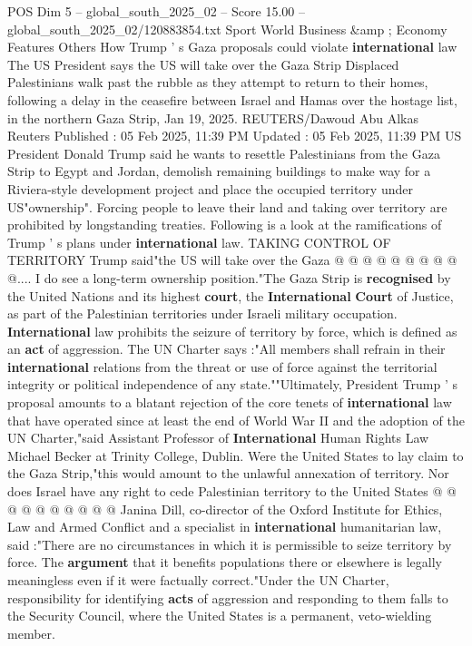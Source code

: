 \begin{textsample}{POS Dim 5 – global\_south\_2025\_02 – Score 15.00 – global\_south\_2025\_02/120883854.txt}  \label{ex:f5_pos_150}
Sport World Business \&amp ; Economy Features Others How Trump ' s Gaza proposals could violate \textbf{international} law The US President says the US will take over the Gaza Strip Displaced Palestinians walk past the rubble as they attempt to return to their homes, following a delay in the ceasefire between Israel and Hamas over the hostage list, in the northern Gaza Strip, Jan 19, 2025.
REUTERS/Dawoud Abu Alkas Reuters Published : 05 Feb 2025, 11:39 PM Updated : 05 Feb 2025, 11:39 PM US President Donald Trump said he wants to resettle Palestinians from the Gaza Strip to Egypt and Jordan, demolish remaining buildings to make way for a Riviera-style development project and place the occupied territory under US"ownership".
Forcing people to leave their land and taking over territory are prohibited by longstanding treaties.
Following is a look at the ramifications of Trump ' s plans under \textbf{international} law.
TAKING CONTROL OF TERRITORY Trump said"the US will take over the Gaza @ @ @ @ @ @ @ @ @ @....
I do see a long-term ownership position."The Gaza Strip is \textbf{recognised} by the United Nations and its highest \textbf{court}, the \textbf{International} \textbf{Court} of Justice, as part of the Palestinian territories under Israeli military occupation. \textbf{International} law prohibits the seizure of territory by force, which is defined as an \textbf{act} of aggression.
The UN Charter says :"All members shall refrain in their \textbf{international} relations from the threat or use of force against the territorial integrity or political independence of any state.""Ultimately, President Trump ' s proposal amounts to a blatant rejection of the core tenets of \textbf{international} law that have operated since at least the end of World War II and the adoption of the UN Charter,"said Assistant Professor of \textbf{International} Human Rights Law Michael Becker at Trinity College, Dublin.
Were the United States to lay claim to the Gaza Strip,"this would amount to the unlawful annexation of territory.
Nor does Israel have any right to cede Palestinian territory to the United States @ @ @ @ @ @ @ @ @ @ Janina Dill, co-director of the Oxford Institute for Ethics, Law and Armed Conflict and a specialist in \textbf{international} humanitarian law, said :"There are no circumstances in which it is permissible to seize territory by force.
The \textbf{argument} that it benefits populations there or elsewhere is legally meaningless even if it were factually correct."Under the UN Charter, responsibility for identifying \textbf{acts} of aggression and responding to them falls to the Security Council, where the United States is a permanent, veto-wielding member.

\end{textsample}
